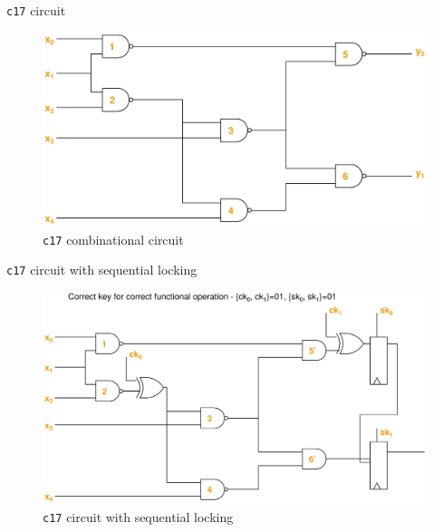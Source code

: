 \begin{frame}{\texttt{c17} circuit}
       \begin{figure}
                \begin{center}
                \label{fig:c17-c}
                \caption{\texttt{c17} combinational circuit}
                        \includegraphics[scale=0.3]{fig/c17_original.pdf}
                \end{center}
        \end{figure}
\end{frame}

\begin{frame}{\texttt{c17} circuit with sequential locking}
       \begin{figure}
                \begin{center}
                \label{fig:c17-s-l}
                \caption{\texttt{c17} circuit with sequential locking}
                        \includegraphics[scale=0.3]{fig/c17_sequentially_locked.pdf}
                \end{center}
        \end{figure}
\end{frame}


